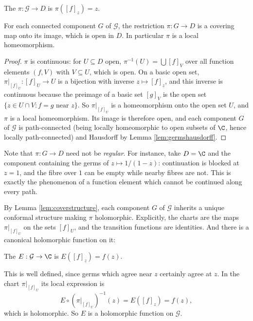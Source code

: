 \begin{definition}
	The  $\pi : \mathcal{G} \to D$ is $\pi([f]_z) = z$.
\end{definition}

\begin{lemma}\label{lem:germscover}
	For each connected component $G$ of $\mathcal{G}$, the restriction $\pi : G \to D$ is a
	covering map onto its image, which is open in $D$. In particular $\pi$ is a local
	homeomorphism.
\end{lemma}

\begin{proof}
	$\pi$ is continuous: for $U \subseteq D$ open, $\pi^{-1}(U) = \bigcup [f]_{V}$ over all
	function elements $(f,V)$ with $V \subseteq U$, which is open. On a basic open set,
	$\pi|_{[f]_U} : [f]_U \to U$ is a bijection with inverse $z \mapsto [f]_z$, and this
	inverse is continuous because the preimage of a basic set $[g]_V$ is the open set
	$\{z \in U \cap V : f = g \text{ near } z\}$. So $\pi|_{[f]_U}$ is a homeomorphism onto
	the open set $U$, and $\pi$ is a local homeomorphism. Its image is therefore open, and
	each component $G$ of $\mathcal{G}$ is path-connected (being locally homeomorphic to
	open subsets of $\C$, hence locally path-connected) and Hausdorff by Lemma
	\ref{lem:germshausdorff}.
\end{proof}

\begin{remark}
	Note that $\pi : G \to D$ need not be \emph{regular}. For instance, take $D = \C$ and
	the component containing the germs of $z \mapsto 1/(1-z)$: continuation is blocked at
	$z=1$, and the fibre over $1$ can be empty while nearby fibres are not. This is exactly
	the phenomenon of a function element which cannot be continued along every path.
\end{remark}

By Lemma \ref{lem:coverstructure}, each component $G$ of $\mathcal{G}$ inherits a unique
conformal structure making $\pi$ holomorphic. Explicitly, the charts are the maps
$\pi|_{[f]_U}$ on the sets $[f]_U$, and the transition functions are identities. And
there is a canonical holomorphic function on it:

\begin{definition}
	The  $E : \mathcal{G} \to \C$ is $E([f]_z) = f(z)$.
\end{definition}

This is well defined, since germs which agree near $z$ certainly agree at $z$. In the
chart $\pi|_{[f]_U}$ its local expression is
$$
E \circ (\pi|_{[f]_U})^{-1}(z) = E([f]_z) = f(z),
$$
which is holomorphic. So $E$ is a holomorphic function on $\mathcal{G}$.

